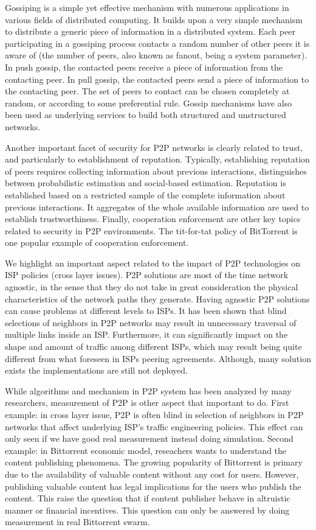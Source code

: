Gossiping is a simple yet effective mechanism with numerous applications in various fields of distributed computing. 
It builds upon a very simple mechanism to distribute a generic piece of information in a distributed system. 
Each peer participating in a gossiping process contacts a random number of other peers it is aware of (the number of peers, also known as fanout, being a system parameter). 
In push gossip, the contacted peers receive a piece of information from the contacting peer. 
In pull gossip, the contacted peers send a piece of information to the contacting peer. 
The set of peers to contact can be chosen completely at random, or according to some preferential rule.
Gossip mechanisms have also been used as underlying services to build both structured and unstructured networks. 

Another important facet of security for P2P networks is clearly related to trust, and particularly to establishment of reputation. 
Typically, establishing reputation of peers requires collecting information about previous interactions, distinguishes between probabilistic estimation and social-based estimation. 
Reputation is established based on a restricted sample of the complete information about previous interactions. 
It aggregates of the whole available information are used to establish trustworthiness.
Finally, cooperation enforcement are other key topics related to security in P2P environments.
The tit-for-tat policy of BitTorrent is one popular example of cooperation enforcement.

We highlight an important aspect related to the impact of P2P technologies on ISP policies (cross layer issues). 
P2P solutions are most of the time network agnostic, in the sense that they do not take in great consideration the physical characteristics of the network paths they generate. 
Having agnostic P2P solutions can cause problems at different levels to ISPs. 
It has been shown that blind selections of neighbors in P2P networks may result in unnecessary traversal of multiple links inside an ISP. 
Furthermore, it can significantly impact on the shape and amount of traffic among different ISPs, which may result being quite different from what foreseen in ISPs peering agreements.
Although, many solution exists the implementations are still not deployed. 

While algorithms and mechanism in P2P system has been analyzed by many researchers, measurement of P2P is other aspect that important to do. 
First example: in cross layer issue, P2P is often blind in selection of neighbors in P2P networks that affect underlying ISP's traffic engineering policies.  
This effect can only seen if we have good real measurement instead doing simulation.
Second example: in Bittorrent economic model, reseachers wants to understand the content publishing phenomena. 
The growing popularity of Bittorrent is primary due to the availability of valuable content without any cost for users.
However, publishing valuable content has legal implications for the users who publish the content.
This raise the question that if content publisher behave in altruistic manner or financial incentives. 
This question can only be answered by doing measurement in real Bittorrent swarm. 

